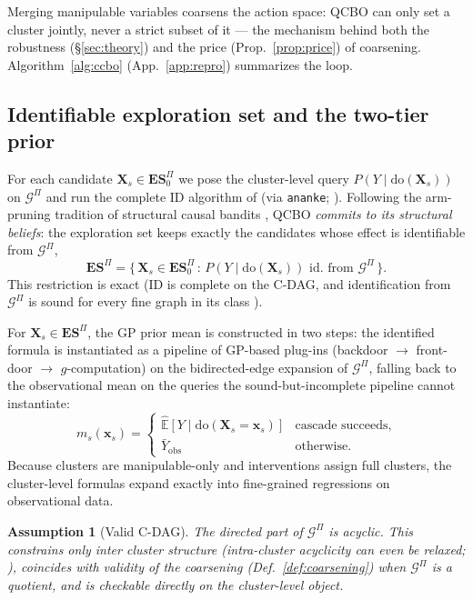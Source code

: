 \documentclass[twoside]{article}
\newtheorem{assumption}{Assumption}
\newcommand{\E}{\mathbb{E}}
\newcommand{\doo}{\mathrm{do}}
\newcommand{\QCBO}{\textsc{QCBO}}
\newcommand{\Gq}{\mathcal{G}^{\Pi}}
\newcommand{\ESpi}{\mathbf{ES}^{\Pi}}
\begin{document}
Merging manipulable variables coarsens the action space: \QCBO{} can only set a cluster jointly, never a strict subset of it --- the mechanism behind both the robustness (\S\ref{sec:theory}) and the price (Prop.~\ref{prop:price}) of coarsening. Algorithm~\ref{alg:ccbo} (App.~\ref{app:repro}) summarizes the loop.

\subsection{Identifiable exploration set and the two-tier prior}
\label{sec:causal_prior}
For each candidate $\mathbf{X}_s\in\ESpi_0$ we pose the cluster-level query $P(Y\mid\doo(\mathbf{X}_s))$ on $\Gq$ and run the complete ID algorithm of \citet{shpitser2006identification} (via \texttt{ananke}; \citealp{lee2023ananke}). Following the arm-pruning tradition of structural causal bandits \citep{lee2018structural}, \QCBO{} \emph{commits to its structural beliefs}: the exploration set keeps exactly the candidates whose effect is identifiable from $\Gq$,
\begin{equation}
  \label{eq:es_gate}
  \ESpi = \{\,\mathbf{X}_s\in\ESpi_0 \,:\, P(Y\mid\doo(\mathbf{X}_s))\text{ id.\ from }\Gq\,\}.
\end{equation}
This restriction is exact (ID is complete on the C-DAG, and identification from $\Gq$ is sound for every fine graph in its class \citealp{anand2023cdag}).

For $\mathbf{X}_s\in\ESpi$, the GP prior mean is constructed in two steps: the identified formula is instantiated as a pipeline of GP-based plug-ins (backdoor $\to$ front-door $\to$ $g$-computation) on the bidirected-edge expansion of $\Gq$, falling back to the observational mean on the queries the sound-but-incomplete pipeline cannot instantiate:
\begin{equation}
  \label{eq:two_tier_prior}
  m_s(\mathbf{x}_s) = \begin{cases}
    \hat{\E}[Y\mid\doo(\mathbf{X}_s=\mathbf{x}_s)] & \text{cascade succeeds,}\\
    \bar{Y}_{\mathrm{obs}} & \text{otherwise.}
  \end{cases}
\end{equation}
Because clusters are manipulable-only and interventions assign full clusters, the cluster-level formulas expand exactly into fine-grained regressions on observational data.

\begin{assumption}[Valid C-DAG]
\label{ass:valid}
The directed part of $\Gq$ is acyclic. This constrains only inter cluster structure (intra-cluster acyclicity can even be relaxed; \citealp{madaleno2026cycles}), coincides with validity of the coarsening (Def.~\ref{def:coarsening}) when $\Gq$ is a quotient, and is checkable directly on the cluster-level object.
\end{assumption}
\end{document}
